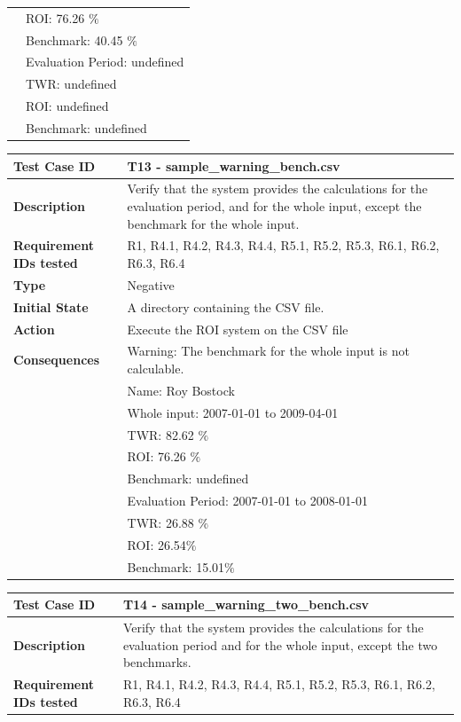 \documentclass[runningheads,12pt]{article}
\begin{document}
{\begin{tabular}{|p{1.2in}|p{4in}|}
& ROI: 76.26 $\%$\\
& Benchmark: 40.45 $\%$ \\ 
& Evaluation Period: undefined\\
& TWR: undefined\\
& ROI: undefined\\
& Benchmark: undefined \\ 
\hline
\end{tabular}
\bigskip
\centering
\begin{tabular}{|p{1.2in}|p{4in}|}
\hline
\textbf{Test Case ID} & T13 - sample\_warning\_bench.csv \\ 
\hline
\textbf{Description} & Verify that the system provides the calculations for the evaluation period, and for the whole input, except the benchmark for the whole input.\\
\hline
\textbf{Requirement IDs tested} & R1, R4.1, R4.2, R4.3, R4.4, R5.1, R5.2, R5.3, R6.1, R6.2, R6.3, R6.4 \\ 
\hline
\textbf{Type} & Negative \\ 
\hline
\textbf{Initial State} & A directory containing the CSV file.\\
\hline 
\textbf{Action} & Execute the ROI system on the CSV file \\
\hline 
\textbf{Consequences} & Warning: The benchmark for the whole input is not calculable.\\
& Name: Roy Bostock\\
& Whole input: 2007-01-01 to 2009-04-01\\
& TWR:  82.62 $\%$\\
& ROI: 76.26 $\%$\\
& Benchmark: undefined \\ 
& Evaluation Period: 2007-01-01 to 2008-01-01\\
& TWR: 26.88 $\%$\\
& ROI: 26.54$\%$\\
& Benchmark: 15.01$\%$ \\ 
\hline
\end{tabular}
\bigskip
\centering
\begin{tabular}{|p{1.2in}|p{4in}|}
\hline
\textbf{Test Case ID} & T14 - sample\_warning\_two\_bench.csv \\ 
\hline
\textbf{Description} & Verify that the system provides the calculations for the evaluation period and for the whole input, except the two benchmarks.\\
\hline
\textbf{Requirement IDs tested} & R1, R4.1, R4.2, R4.3, R4.4, R5.1, R5.2, R5.3, R6.1, R6.2, R6.3, R6.4 \\ 

\end{tabular}}
\end{document}
